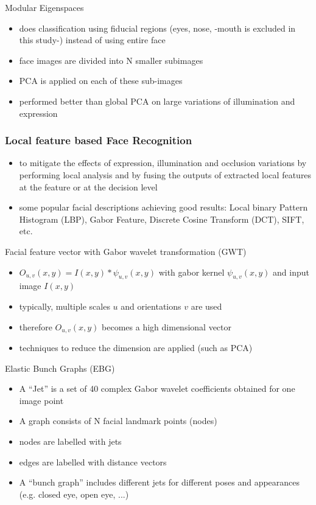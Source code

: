 \documentclass[paper=a4, fontsize=11pt]{scrartcl} %
\numberwithin{equation}{section} %
\numberwithin{figure}{section} %
\numberwithin{table}{section} %
\begin{document}
Modular Eigenspaces
\begin{itemize}
\item does classification using fiducial regions (eyes, nose, -mouth is excluded in this study-) instead of using entire face
\item face images are divided into N smaller subimages
\item PCA is applied on each of these sub-images
\item performed better than global PCA on large variations of illumination and expression
\end{itemize}

\subsubsection{Local feature based Face Recognition}

\begin{itemize}
\item to mitigate the effects of expression, illumination and occlusion variations by performing local analysis and by fusing the outputs of extracted local features at the feature or at the decision level
\item some popular facial descriptions achieving good results: Local binary Pattern Histogram (LBP), Gabor Feature, Discrete Cosine Transform (DCT), SIFT, etc.
\end{itemize}

Facial feature vector with Gabor wavelet transformation (GWT)
\begin{itemize}
\item $O_{u,v}(x,y) = I(x,y) * \psi_{u,v}(x,y)$ with gabor kernel $\psi_{u,v}(x,y)$ and input image $I(x,y)$
\item typically, multiple scales $u$ and orientations $v$ are used
\item therefore $O_{u,v}(x,y)$ becomes a high dimensional vector
\item techniques to reduce the dimension are applied (such as PCA)
\end{itemize}

Elastic Bunch Graphs (EBG)
\begin{itemize}
\item A ``Jet'' is a set of 40 complex Gabor wavelet coefficients obtained for one image point
\item A graph consists of N facial landmark points (nodes)
\item nodes are labelled with jets
\item edges are labelled with distance vectors
\item A ``bunch graph'' includes different jets for different poses and appearances (e.g. closed eye, open eye, ...)
\end{itemize}
\end{document}
